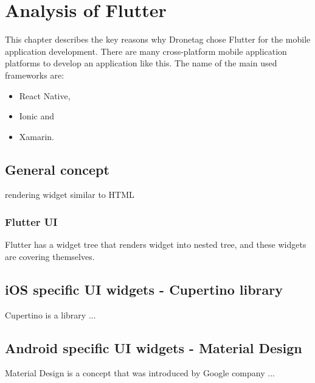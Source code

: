 \chapter{Analysis of Flutter}\label{ch:analysis-of-flutter}

This chapter describes the key reasons why Dronetag chose Flutter for the mobile application development.
There are many cross-platform mobile application platforms to develop an application like this.
The name of the main used frameworks are:
\begin{itemize}
    \item React Native,
    \item Ionic and
    \item Xamarin.
\end{itemize}

\section{General concept}\label{sec:general-concept}
rendering widget similar to HTML %

\subsection{Flutter UI}\label{subsec:flutter-ui}
Flutter has a widget tree that renders widget into nested tree, and these widgets are covering themselves. %





\section{iOS specific UI widgets - Cupertino library}\label{sec:ios-specific-ui-widgets}
Cupertino is a library ...


\section{Android specific UI widgets - Material Design}\label{sec:android-specific-ui-widgets}
Material Design is a concept that was introduced by Google company ...
